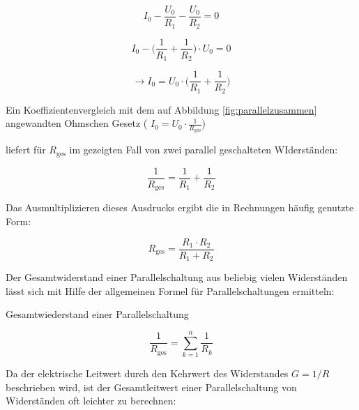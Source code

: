 \begin{frame}
{   \begin{equation*}
	I_0 - \frac{U_0}{R_1} - \frac{U_0}{R_2} = 0
   \end{equation*}

   	
		\begin{equation*}
			I_0 - \bigg( \frac{1}{R_1}+\frac{1}{R_2} \bigg) \cdot U_0 = 0
		\end{equation*}

		\begin{equation*}
			 \rightarrow I_0 = U_0 \cdot  \bigg( \frac{1}{R_1}+\frac{1}{R_2} \bigg)
		\end{equation*}


	Ein Koeffizientenvergleich mit dem auf Abbildung \ref{fig:parallelzusammen} angewandten Ohmschen Gesetz 
	( $I_0 = U_0 \cdot \frac{1}{R_\mathrm{ges}}$)

	liefert für $R_\mathrm{ges}$ im gezeigten Fall von zwei parallel geschalteten WIderständen:

	\begin{equation*}
		\frac{1}{R_\mathrm{ges}} =  \frac{1}{R_1}+\frac{1}{R_2}
	\end{equation*}

	Das Ausmultiplizieren dieses Ausdrucks ergibt die in Rechnungen häufig genutzte Form:

	\begin{equation}
		R_\mathrm{ges} = \frac{R_1\cdot R_2}{R_1 + R_2}
		\label{eq:r2parallel}	
	\end{equation}


	Der Gesamtwiderstand einer Parallelschaltung aus beliebig vielen Widerständen lässt sich mit Hilfe der allgemeinen Formel
	für Parallelschaltungen ermitteln:

	\begin{Merksatz}{Gesamtwiederstand einer Parallelschaltung}

		\begin{equation}
			\frac{1}{R_\mathrm{ges}} = \sum_{k=1}^{n} \frac{1}{R_k} 
			\label{eq:rparallel}
		\end{equation}
	\end{Merksatz}


	Da der elektrische Leitwert durch den Kehrwert des Widerstandes $G=1/R$ beschrieben wird, ist der Gesamtleitwert einer 
	Parallelschaltung von Widerständen oft leichter zu berechnen:



}
\end{frame}
